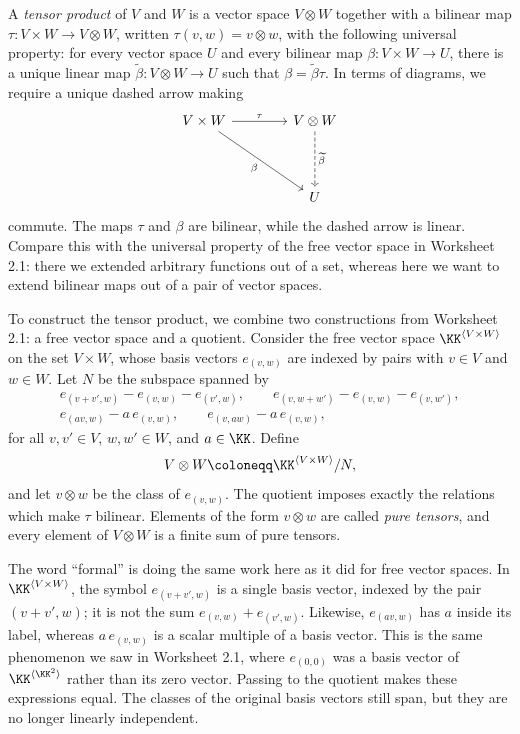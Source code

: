 \documentclass[12pt,reqno]{amsart}
\begin{document}
A \emph{tensor product} of $V$ and $W$ is a vector space $V\otimes W$ together with a bilinear map $\tau:V\times W\to V\otimes W$, written $\tau(v,w)=v\otimes w$, with the following universal property: for every vector space $U$ and every bilinear map $\beta:V\times W\to U$, there is a unique linear map $\widetilde\beta:V\otimes W\to U$ such that $\beta=\widetilde\beta\tau$. In terms of diagrams, we require a unique dashed arrow making
\[
\begin{tikzcd}[row sep=4em,column sep=4em]
V\times W \arrow[r,"\tau"] \arrow[dr,"\beta"'] & V\otimes W \arrow[d,dashed,"\widetilde\beta"]\\
& U
\end{tikzcd}
\]
commute. The maps $\tau$ and $\beta$ are bilinear, while the dashed arrow is linear. Compare this with the universal property of the free vector space in Worksheet 2.1: there we extended arbitrary functions out of a set, whereas here we want to extend bilinear maps out of a pair of vector spaces.

To construct the tensor product, we combine two constructions from Worksheet 2.1: a free vector space and a quotient. Consider the free vector space $\KK^{\langle V\times W\rangle}$ on the set $V\times W$, whose basis vectors $e_{(v,w)}$ are indexed by pairs with $v\in V$ and $w\in W$. Let $N$ be the subspace spanned by
\[
\begin{gathered}
e_{(v+v',w)}-e_{(v,w)}-e_{(v',w)},\qquad e_{(v,w+w')}-e_{(v,w)}-e_{(v,w')},\\
e_{(av,w)}-a\,e_{(v,w)},\qquad e_{(v,aw)}-a\,e_{(v,w)},
\end{gathered}
\]
for all $v,v'\in V$, $w,w'\in W$, and $a\in\KK$. Define
\[
V\otimes W\coloneqq\KK^{\langle V\times W\rangle}/N,
\]
and let $v\otimes w$ be the class of $e_{(v,w)}$. The quotient imposes exactly the relations which make $\tau$ bilinear. Elements of the form $v\otimes w$ are called \emph{pure tensors}, and every element of $V\otimes W$ is a finite sum of pure tensors.

The word ``formal'' is doing the same work here as it did for free vector spaces. In $\KK^{\langle V\times W\rangle}$, the symbol $e_{(v+v',w)}$ is a single basis vector, indexed by the pair $(v+v',w)$; it is not the sum $e_{(v,w)}+e_{(v',w)}$. Likewise, $e_{(av,w)}$ has $a$ inside its label, whereas $a\,e_{(v,w)}$ is a scalar multiple of a basis vector. This is the same phenomenon we saw in Worksheet 2.1, where $e_{(0,0)}$ was a basis vector of $\KK^{\langle\KK^2\rangle}$ rather than its zero vector. Passing to the quotient makes these expressions equal. The classes of the original basis vectors still span, but they are no longer linearly independent.
\end{document}
